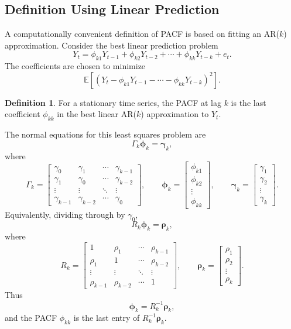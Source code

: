 \documentclass[12pt,oneside]{book}
\numberwithin{equation}{section}
\theoremstyle{definition}
\newtheorem{definition}{Definition}[section]
\theoremstyle{plain}
\theoremstyle{remark}
\newcommand{\E}{\mathbb{E}}
\begin{document}
\subsection{Definition Using Linear Prediction}

A computationally convenient definition of PACF is based on fitting an AR($k$) approximation. Consider the best linear prediction problem
\[
Y_t
=
\phi_{k1}Y_{t-1}
+
\phi_{k2}Y_{t-2}
+\cdots+
\phi_{kk}Y_{t-k}
+
e_t.
\]
The coefficients are chosen to minimize
\[
\E\left[
(Y_t-\phi_{k1}Y_{t-1}-\cdots-\phi_{kk}Y_{t-k})^2
\right].
\]

\begin{definition}
For a stationary time series, the PACF at lag $k$ is the last coefficient $\phi_{kk}$ in the best linear AR($k$) approximation to $Y_t$.
\end{definition}

The normal equations for this least squares problem are
\[
\Gamma_k\bm{\phi}_k=\bm{\gamma}_k,
\]
where
\[
\Gamma_k
=
\begin{bmatrix}
\gamma_0 & \gamma_1 & \cdots & \gamma_{k-1}\\
\gamma_1 & \gamma_0 & \cdots & \gamma_{k-2}\\
\vdots & \vdots & \ddots & \vdots\\
\gamma_{k-1} & \gamma_{k-2} & \cdots & \gamma_0
\end{bmatrix},
\qquad
\bm{\phi}_k
=
\begin{bmatrix}
\phi_{k1}\\
\phi_{k2}\\
\vdots\\
\phi_{kk}
\end{bmatrix},
\qquad
\bm{\gamma}_k
=
\begin{bmatrix}
\gamma_1\\
\gamma_2\\
\vdots\\
\gamma_k
\end{bmatrix}.
\]
Equivalently, dividing through by $\gamma_0$,
\[
R_k\bm{\phi}_k=\bm{\rho}_k,
\]
where
\[
R_k
=
\begin{bmatrix}
1 & \rho_1 & \cdots & \rho_{k-1}\\
\rho_1 & 1 & \cdots & \rho_{k-2}\\
\vdots & \vdots & \ddots & \vdots\\
\rho_{k-1} & \rho_{k-2} & \cdots & 1
\end{bmatrix},
\qquad
\bm{\rho}_k
=
\begin{bmatrix}
\rho_1\\
\rho_2\\
\vdots\\
\rho_k
\end{bmatrix}.
\]
Thus
\[
\bm{\phi}_k=R_k^{-1}\bm{\rho}_k,
\]
and the PACF $\phi_{kk}$ is the last entry of $R_k^{-1}\bm{\rho}_k$.
\end{document}
